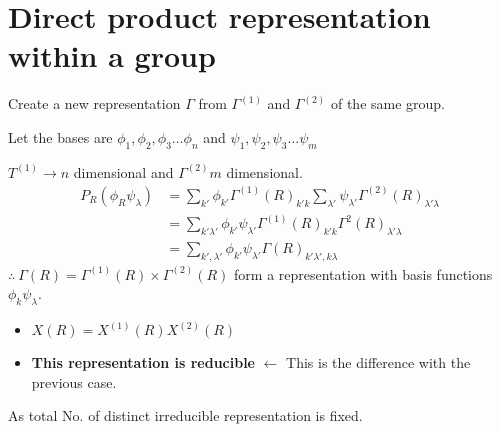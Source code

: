 \section*{Direct product representation within a group}

Create a new representation $\Gamma$ from $\Gamma^{(1)}$ and $\Gamma^{(2)}$ of the same group.

Let the bases are $\phi_{1},\phi_{2},\phi_{3}\ldots \phi_{n}$ and $\psi_{1},\psi_{2},\psi_{3}\ldots\psi_{m}$ 

$T^{(1)}\to n$ dimensional and $\Gamma^{(2)} m$ dimensional.
\begin{align*}
P_{R}(\phi_{R}\psi_{\lambda}) &= \sum\limits_{k'}\phi_{k'}\Gamma^{(1)}(R)_{k'k}\sum\limits_{\lambda'}\psi_{\lambda'}\Gamma^{(2)}(R)_{\lambda'\lambda}\\
&=\sum\limits_{k'\lambda'}\phi_{k'}\psi_{\lambda'}\Gamma^{(1)}(R)_{k'k}\Gamma^{2}(R)_{\lambda'\lambda}\\
&=\sum\limits_{k',\lambda'}\phi_{k'}\psi_{\lambda'}\Gamma(R)_{k'\lambda',k\lambda}
\end{align*}
$\therefore \ \Gamma(R)=\Gamma^{(1)}(R)\times \Gamma^{(2)}(R)$ form a representation with basis functions $\phi_{k}\psi_{\lambda}$.
\begin{itemize}
\item $X(R)=X^{(1)}(R)X^{(2)}(R)$

\item {\bf This representation is reducible} $\leftarrow$ This is the difference with the previous case.
\end{itemize}

As total No. of distinct irreducible representation is fixed.









